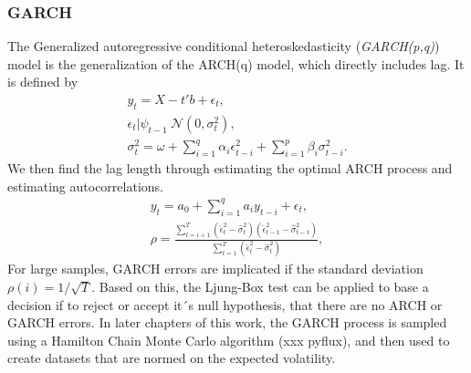 \subsubsection{GARCH}
The Generalized autoregressive conditional heteroskedasticity (\textit{GARCH(p,q)}) model is the generalization of the ARCH(q) model, which directly includes lag. It is defined by 
\begin{subequations}
	\label{eq:GARCH definition}
	\begin{align}
	y_t = X-t'b + \epsilon_t,         \label{eq:GARCH main process} \\
	\epsilon_t | \psi_{t-1} ~ \mathcal{N}(0,\sigma_t^2),         \label{eq:GARCH noise} \\
	\sigma_t^2 = \omega + \sum_{i=1}^{q}\alpha_i \epsilon_{t-i}^2 + \sum_{i=1}^{p}\beta_i \sigma_{t-i}^2.         \label{eq:GARCH variance} 
	\end{align}
\end{subequations}
We then find the lag length through estimating the optimal ARCH process and estimating autocorrelations. 
\begin{subequations}
	\label{eq:GARCH lag length}
	\begin{align}
	y_t = a_0 + \sum_{i=1}^{q}a_i y_{t-i} + \epsilon_t,         \label{eq:GARCH lag ARCH} \\
	\rho = \frac{\sum_{t=i+1}^{T}(\hat{\epsilon}_t^2 -\hat{\sigma}_t^2)(\hat{\epsilon}_{t-1}^2 -\hat{\sigma}_{t-1}^2)}{\sum_{t=1}^{T}(\hat{\epsilon}_t^2 -\hat{\sigma}_t^2)},         \label{eq:GARCH estimate autocorrelations}
	\end{align}
\end{subequations}
For large samples, GARCH errors are implicated if the standard deviation $\rho(i)=1/\sqrt{T}$. Based on this, the Ljung-Box test can be applied to base a decision if to reject or accept it´s null hypothesis, that there are no ARCH or GARCH errors. In later chapters of this work, the GARCH process is sampled using a Hamilton Chain Monte Carlo algorithm (xxx pyflux), and then used to create datasets that are normed on the expected volatility. 